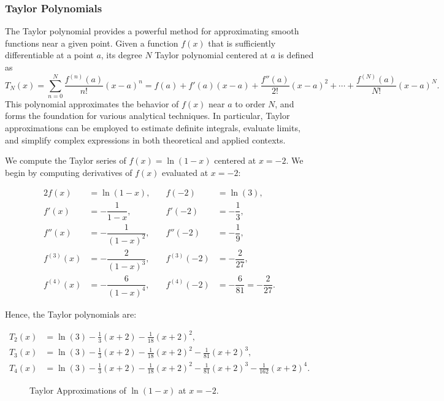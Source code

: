 \subsubsection{Taylor Polynomials}
The Taylor polynomial provides a powerful method for approximating smooth functions near a given point. Given a function $f(x)$ that is sufficiently differentiable at a point $a$, its degree $N$ Taylor polynomial centered at $a$ is defined as  
\[
T_N(x) = \sum_{n=0}^N \frac{f^{(n)}(a)}{n!} (x-a)^n = f(a) + f'(a)(x - a) + \frac{f''(a)}{2!}(x - a)^2 + \cdots + \frac{f^{(N)}(a)}{N!}(x - a)^N.
\]
This polynomial approximates the behavior of $f(x)$ near $a$ to order $N$, and forms the foundation for various analytical techniques. In particular, Taylor approximations can be employed to estimate definite integrals, evaluate limits, and simplify complex expressions in both theoretical and applied contexts.

\begin{ex}[Taylor Polynomials of $f(x) = \ln(1 - x)$ about $x = -2$]

We compute the Taylor series of $f(x) = \ln(1 - x)$ centered at $x = -2$.  
We begin by computing derivatives of $f(x)$ evaluated at $x = -2$:

\begin{alignat*}{2}
f(x) &= \ln(1 - x),       &\quad f(-2) &= \ln(3), \\
f'(x) &= -\dfrac{1}{1 - x}, &\quad f'(-2) &= -\dfrac{1}{3}, \\
f''(x) &= -\dfrac{1}{(1 - x)^2}, &\quad f''(-2) &= -\dfrac{1}{9}, \\
f^{(3)}(x) &= -\dfrac{2}{(1 - x)^3}, &\quad f^{(3)}(-2) &= -\dfrac{2}{27}, \\
f^{(4)}(x) &= -\dfrac{6}{(1 - x)^4}, &\quad f^{(4)}(-2) &= -\dfrac{6}{81} = -\dfrac{2}{27}.
\end{alignat*}

Hence, the Taylor polynomials are:

\[
\begin{aligned}
T_2(x) &= \ln(3) - \frac{1}{3}(x + 2) - \frac{1}{18}(x + 2)^2, \\
T_3(x) &= \ln(3) - \frac{1}{3}(x + 2) - \frac{1}{18}(x + 2)^2 - \frac{1}{81}(x + 2)^3, \\
T_4(x) &= \ln(3) - \frac{1}{3}(x + 2) - \frac{1}{18}(x + 2)^2 - \frac{1}{81}(x + 2)^3 - \frac{1}{162}(x + 2)^4.
\end{aligned}
\]
\end{ex}
\begin{figure}[H]
        \centering
        \resizebox{\textwidth}{!}{} %
        \caption{Taylor Approximations of $\ln(1 - x)$ at $x = -2$.}
        \label{fig:Taylor polynomial}
    \end{figure}
 


